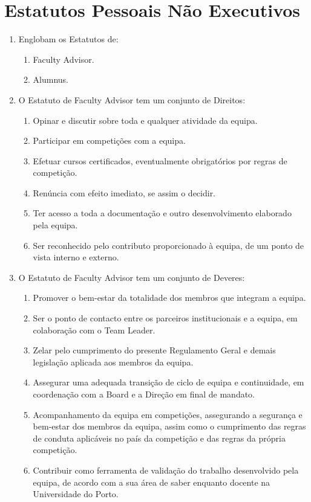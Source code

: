 \section{Estatutos Pessoais Não Executivos}
\begin{enumerate}
  \item Englobam os Estatutos de:
  \begin{enumerate}
    \item Faculty Advisor.
    \item Alumnus.
  \end{enumerate}
  \item O Estatuto de Faculty Advisor tem um conjunto de Direitos:
  \begin{enumerate}
    \item Opinar e discutir sobre toda e qualquer atividade da equipa.
    \item Participar em competições com a equipa.
    \item Efetuar cursos certificados, eventualmente obrigatórios por regras de competição.
    \item Renúncia com efeito imediato, se assim o decidir.
    \item Ter acesso a toda a documentação e outro desenvolvimento elaborado pela equipa.
    \item Ser reconhecido pelo contributo proporcionado à equipa, de um ponto de vista interno e externo.
  \end{enumerate}
  \item O Estatuto de Faculty Advisor tem um conjunto de Deveres:
  \begin{enumerate}
    \item Promover o bem-estar da totalidade dos membros que integram a equipa.
    \item Ser o ponto de contacto entre os parceiros institucionais e a equipa, em colaboração com o Team Leader.
    \item Zelar pelo cumprimento do presente Regulamento Geral e demais legislação aplicada aos membros da equipa.
    \item Assegurar uma adequada transição de ciclo de equipa e continuidade, em coordenação com a Board e a Direção em final de mandato.
    \item Acompanhamento da equipa em competições, assegurando a segurança e bem-estar dos membros da equipa, assim como o cumprimento das regras de conduta aplicáveis no país da competição e das regras da própria competição.
    \item Contribuir como ferramenta de validação do trabalho desenvolvido pela equipa, de acordo com a sua área de saber enquanto docente na Universidade do Porto.

\end{enumerate}
\end{enumerate}

